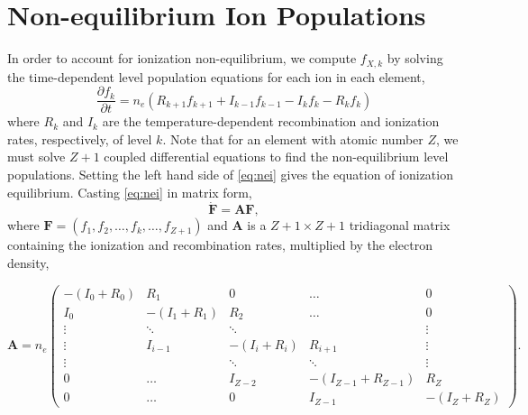 \section{Non-equilibrium Ion Populations}\label{nei}

In order to account for ionization non-equilibrium, we compute $f_{X,k}$ by solving the time-dependent level population equations for each ion in each element,
\begin{equation}\label{eq:nei}
    \frac{\partial f_k}{\partial t} = n_e(R_{k+1}f_{k+1} + I_{k-1}f_{k-1} - I_kf_k - R_kf_k)
\end{equation}
where $R_k$ and $I_k$ are the temperature-dependent recombination and ionization rates, respectively, of level $k$. Note that for an element with atomic number $Z$, we must solve $Z+1$ coupled differential equations to find the non-equilibrium level populations. Setting the left hand side of \autoref{eq:nei} gives the equation of ionization equilibrium. Casting \autoref{eq:nei} in matrix form,
\begin{equation}\label{eq:nei_mat}
    \dot{\mathbf{F}} = \mathbf{A}\mathbf{F},
\end{equation}
where $\mathbf{F}=(f_1,f_2,\ldots,f_k,\ldots,f_{Z+1})$ and $\mathbf{A}$ is a ${Z+1\times Z+1}$ tridiagonal matrix containing the ionization and recombination rates, multiplied by the electron density,

\begin{equation}
    \mathbf{A} = n_e
        \begin{pmatrix}
            -(I_0 + R_0) & R_1 & 0 & \dots & 0 \\
            I_0 & -(I_1 + R_1) & R_2 & \dots & 0 \\
            \vdots & \ddots & \ddots & & \vdots \\
            \vdots & I_{i-1} & -(I_i + R_i) & R_{i+1} & \vdots \\
            \vdots & & \ddots & \ddots & \vdots \\
            0 & \dots & I_{Z-2} & -(I_{Z-1} + R_{Z-1}) & R_Z \\
            0 & \dots & 0 & I_{Z-1} & -(I_Z + R_Z) 
        \end{pmatrix}.
\end{equation}

